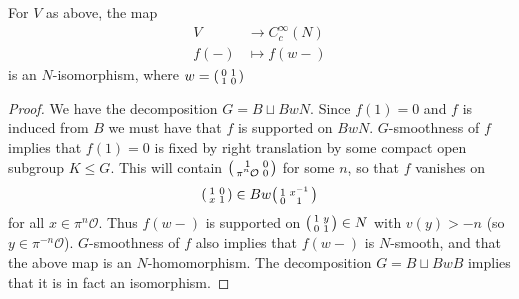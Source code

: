 \begin{lemma}\label{reduce to N}
    For $V$ as above, the map 
    \begin{equation*}
        \begin{split}
            V &\to C_c^\infty(N) \\
            f(-) &\mapsto f(w-) 
        \end{split}
    \end{equation*}
    is an $N$-isomorphism, where $w=\begin{psmallmatrix}
        0&1\\1&0
    \end{psmallmatrix}$
\end{lemma}
\begin{proof}
    We have the decomposition $G=B \sqcup BwN$. Since $f(1)=0$ and $f$ is induced from $B$ we must have that $f$ is supported on $BwN$. $G$-smoothness of $f$ implies that $f(1)=0$ is fixed by right translation by some compact open subgroup $K\leq G$. This will contain $\begin{psmallmatrix}
        1&0\\\pi^n \mathcal O &0
    \end{psmallmatrix}$ for some $n$, so that $f$ vanishes on 
    $$\begin{psmallmatrix}
        1&0\\x&1
    \end{psmallmatrix} \in Bw \begin{psmallmatrix}
        1&x^{-1}\\0&1
    \end{psmallmatrix}$$
    for all $x \in \pi^n \mathcal O$. Thus $f(w-)$ is supported on $\begin{psmallmatrix}
        1&y\\0&1
    \end{psmallmatrix} \in N$ with $v(y) > -n$ (so $y \in \pi^{-n}\mathcal O$). $G$-smoothness of $f$ also implies that $f(w-)$ is $N$-smooth, and that the above map is an $N$-homomorphism. The decomposition $G=B \sqcup BwB$ implies that it is in fact an isomorphism.
\end{proof}

